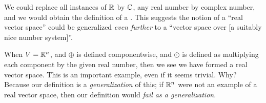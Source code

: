 \begin{remark}
We could replace all instances of $\mathbb{R}$ by $\mathbb{C}$, any real number by
complex number, and we would obtain the definition of a .
This suggests the notion of a ``real vector space'' could be generalized
\emph{even further} to a ``vector space over [a suitably nice number system]''.
\end{remark}

\begin{example}
When $V=\mathbb{R}^{n}$, and $\oplus$ is defined componentwise, and $\odot$ is
defined as multiplying each component by the given real number, then we
see we have formed a real vector space. This is an important example,
even if it seems trivial. Why? Because our definition is a
\emph{generalization} of this; if $\mathbb{R}^{n}$ were not an example of a
real vector space, then our definition would \emph{fail as a generalization}.
\end{example}

